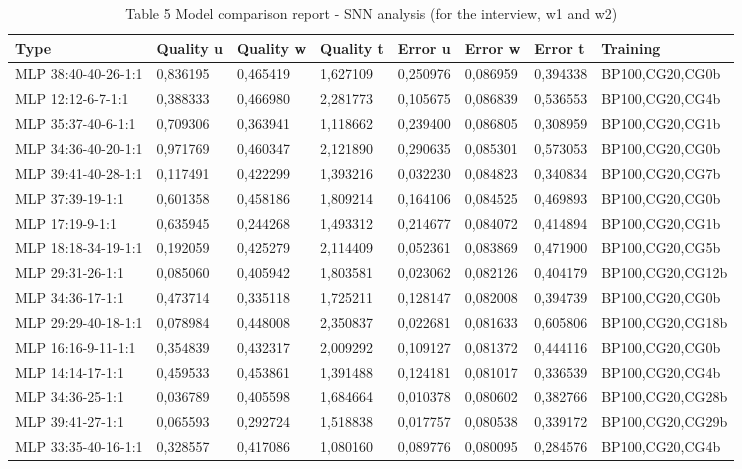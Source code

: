 \documentclass[10pt,oneside]{memoir}
\begin{document}
\begin{table}[htbp]
\begin{minipage}{\linewidth}
\setlength{\tymax}{0.5\linewidth}
\centering
\small
\caption{Table 5 Model comparison report - SNN analysis (for the interview, w1 and w2)}
\label{table5}
\begin{tabulary}{\linewidth}{@{}l@{}l@{}l@{}l@{}l@{}l@{}l@{}l@{}} \\ \toprule 
Type&Quality u&Quality w&Quality t&Error u&Error w&Error t&Training \\\midrule
MLP 38:40-40-26-1:1&0,836195&0,465419&1,627109&0,250976&0,086959&0,394338&BP100,CG20,CG0b \\
MLP 12:12-6-7-1:1&0,388333&0,466980&2,281773&0,105675&0,086839&0,536553&BP100,CG20,CG4b \\
MLP 35:37-40-6-1:1&0,709306&0,363941&1,118662&0,239400&0,086805&0,308959&BP100,CG20,CG1b \\
MLP 34:36-40-20-1:1&0,971769&0,460347&2,121890&0,290635&0,085301&0,573053&BP100,CG20,CG0b \\
MLP 39:41-40-28-1:1&0,117491&0,422299&1,393216&0,032230&0,084823&0,340834&BP100,CG20,CG7b \\
MLP 37:39-19-1:1&0,601358&0,458186&1,809214&0,164106&0,084525&0,469893&BP100,CG20,CG0b \\
MLP 17:19-9-1:1&0,635945&0,244268&1,493312&0,214677&0,084072&0,414894&BP100,CG20,CG1b \\
MLP 18:18-34-19-1:1&0,192059&0,425279&2,114409&0,052361&0,083869&0,471900&BP100,CG20,CG5b \\
MLP 29:31-26-1:1&0,085060&0,405942&1,803581&0,023062&0,082126&0,404179&BP100,CG20,CG12b \\
MLP 34:36-17-1:1&0,473714&0,335118&1,725211&0,128147&0,082008&0,394739&BP100,CG20,CG0b \\
MLP 29:29-40-18-1:1&0,078984&0,448008&2,350837&0,022681&0,081633&0,605806&BP100,CG20,CG18b \\
MLP 16:16-9-11-1:1&0,354839&0,432317&2,009292&0,109127&0,081372&0,444116&BP100,CG20,CG0b \\
MLP 14:14-17-1:1&0,459533&0,453861&1,391488&0,124181&0,081017&0,336539&BP100,CG20,CG4b \\
MLP 34:36-25-1:1&0,036789&0,405598&1,684664&0,010378&0,080602&0,382766&BP100,CG20,CG28b \\
MLP 39:41-27-1:1&0,065593&0,292724&1,518838&0,017757&0,080538&0,339172&BP100,CG20,CG29b \\
MLP 33:35-40-16-1:1&0,328557&0,417086&1,080160&0,089776&0,080095&0,284576&BP100,CG20,CG4b \\

\end{tabulary}
\end{minipage}
\end{table}
\end{document}
